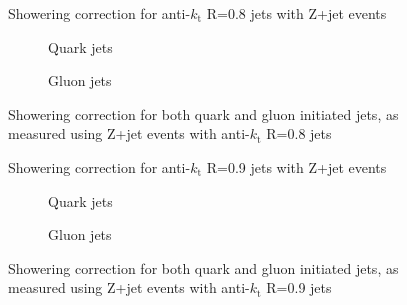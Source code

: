 \clearpage
\begin{figure}[!ht]
 \centering
 \caption[Showering correction for anti-$k_{\mathrm t}$ R=0.8 jets with Z+jet events]
 {\small Showering correction for anti-$k_{\mathrm t}$ R=0.8 jets with Z+jet events}
 \label{plot:ZJetShowering8App}
\end{figure}

\begin{figure}[!ht]
 \centering
 \begin{subfigure}{.5\textwidth}
  \centering
  \caption{Quark jets}
 \end{subfigure}%
 \begin{subfigure}{.5\textwidth}
  \centering
  \caption{Gluon jets}
 \end{subfigure}
 \caption[Quark/gluon jet showering correction, anti-$k_{\mathrm t}$ R=0.8, Z+jet]
 {\small Showering correction for both quark and gluon initiated jets, as measured using Z+jet events with anti-$k_{\mathrm t}$ R=0.8 jets}
 \label{plot:ZJetShoweringFlav8App}
\end{figure}

\clearpage
\begin{figure}[!ht]
 \centering
 \caption[Showering correction for anti-$k_{\mathrm t}$ R=0.9 jets with Z+jet events]
 {\small Showering correction for anti-$k_{\mathrm t}$ R=0.9 jets with Z+jet events}
 \label{plot:ZJetShowering9App}
\end{figure}

\begin{figure}[!ht]
 \centering
 \begin{subfigure}{.5\textwidth}
  \centering
  \caption{Quark jets}
 \end{subfigure}%
 \begin{subfigure}{.5\textwidth}
  \centering
  \caption{Gluon jets}
 \end{subfigure}
 \caption[Quark/gluon jet showering correction, anti-$k_{\mathrm t}$ R=0.9, Z+jet]
 {\small Showering correction for both quark and gluon initiated jets, as measured using Z+jet events with anti-$k_{\mathrm t}$ R=0.9 jets}
 \label{plot:ZJetShoweringFlav9App}
\end{figure}

